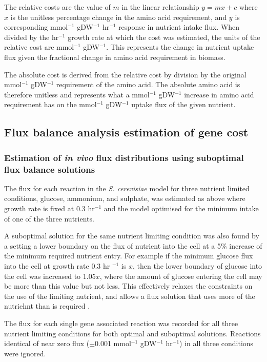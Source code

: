The relative costs are the value of $m$ in the linear relationship $y = mx + c$ where $x$ is the unitless percentage change in the amino acid requirement, and $y$ is corresponding mmol$^{-1}$ gDW$^{-1}$ hr$^{-1}$ response in nutrient intake flux. When divided by the hr$^{-1}$ growth rate at which the cost was estimated, the units of the relative cost are mmol$^{-1}$ gDW$^{-1}$. This represents the change in nutrient uptake flux given the fractional change in amino acid requirement in biomass.

The absolute cost is derived from the relative cost by division by the original mmol$^{-1}$ gDW$^{-1}$ requirement of the amino acid. The absolute amino acid is therefore unitless and represents what a mmol$^{-1}$ gDW$^{-1}$ increase in amino acid requirement has on the mmol$^{-1}$ gDW$^{-1}$ uptake flux of the given nutrient.

\subsection{Flux balance analysis estimation of gene cost}%

\subsubsection{Estimation of \emph{in vivo} flux distributions using suboptimal flux balance solutions}%

The flux for each reaction in the \emph{S. cerevisiae} model for three nutrient limited conditions, glucose, ammonium, and sulphate, was estimated as above where growth rate is fixed at 0.3 hr$^{-1}$ and the model optimised for the minimum intake of one of the three nutrients.

A suboptimal solution for the same nutrient limiting condition was also found by a setting a lower boundary on the flux of nutrient into the cell at a 5\% increase of the minimum required nutrient entry. For example if the minimum glucose flux into the cell at growth rate 0.3 hr $^{-1}$ is $x$, then the lower boundary of glucose into the cell was increased to 1.05$x$, where the amount of glucose entering the cell may be more than this value but not less. This effectively relaxes the constraints on the use of the limiting nutrient, and allows a flux solution that uses more of the nutriehnt than is required \cite{mahadevan2003}.

The flux for each single gene associated reaction was recorded for all three nutrient limiting conditions for both optimal and suboptimal solutions. Reactions identical of near zero flux ($\pm$0.001 mmol$^{-1}$ gDW$^{-1}$ hr$^{-1}$) in all three conditions were ignored.

